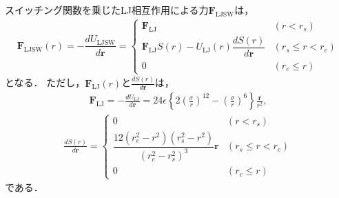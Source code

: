 \documentclass[uplatex,11pt,a4j,titlepage,oneside,openright,dvipdfmx]{jsbook}
\begin{document}
スイッチング関数を乗じたLJ相互作用による力$\bm{F}_{\mathrm{LJSW}}$は，
\begin{eqnarray} \label{eq:LJSW}
 \bm{F}_{\mathrm{LJSW}}(r) = -\dfrac{dU_{\mathrm{LJSW}}}{d\bm{r}} = \left\{
 \begin{array}{ll}
  \bm{F}_{\mathrm{LJ}} & (r < r_s) \\ 
  \bm{F}_{\mathrm{LJ}} S(r) - U_{\mathrm{LJ}}(r)\dfrac{dS(r)}{d\bm{r}}  & (r_s \leq r < r_c) \\
  0 & (r_c \leq r)
 \end{array}
 \right.
\end{eqnarray}
となる．
ただし，$\bm{F}_{\mathrm{LJ}}(r)$と$\frac{dS(r)}{d\bm{r}}$は，
\begin{eqnarray}
 \bm{F}_{\mathrm{LJ}} = -\frac{dU_{\mathrm{LJ}}}{d\bm{r}} = 24\epsilon \left\{ 2\left( \frac{\sigma}{r} \right)^{12} - \left( \frac{\sigma}{r} \right)^{6} \right\}\frac{\bm{r}}{r^2},
\end{eqnarray}
\begin{eqnarray}
 \frac{dS(r)}{d\bm{r}} = \left\{
  \begin{array}{ll}
   0 & (r < r_s) \\
   \dfrac{12(r_c^2-r^2)(r_s^2 - r^2)}{(r_c^2-r_s^2)^3} \bm{r}& (r_s \leq r < r_c) \\
   0 & (r_c \leq r)
  \end{array}
  \right.
\end{eqnarray}
である．


\end{document}
